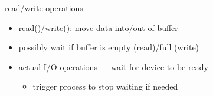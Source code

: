 \begin{frame}{read/write operations}
\begin{itemize}
\item read()/write(): move data into/out of buffer
\item possibly wait if buffer is empty (read)/full (write)
\vspace{.5cm}
\item actual I/O operations --- wait for device to be ready
    \begin{itemize}
    \item trigger process to stop waiting if needed
    \end{itemize}
\end{itemize}
\end{frame}
